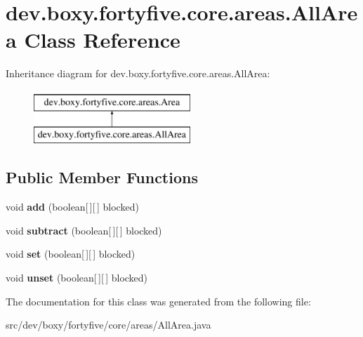 \hypertarget{classdev_1_1boxy_1_1fortyfive_1_1core_1_1areas_1_1_all_area}{
\section{dev.boxy.fortyfive.core.areas.AllArea Class Reference}
\label{d3/d77/classdev_1_1boxy_1_1fortyfive_1_1core_1_1areas_1_1_all_area}
}
Inheritance diagram for dev.boxy.fortyfive.core.areas.AllArea:\begin{figure}[H]
\begin{center}
\leavevmode
\includegraphics[height=2.000000cm]{d3/d77/classdev_1_1boxy_1_1fortyfive_1_1core_1_1areas_1_1_all_area}
\end{center}
\end{figure}
\subsection*{Public Member Functions}
\begin{DoxyCompactItemize}
\item 
\hypertarget{classdev_1_1boxy_1_1fortyfive_1_1core_1_1areas_1_1_all_area_a12ed6995b2a7b10c7fc6c8a81d3bd874}{
void {\bfseries add} (boolean\mbox{[}$\,$\mbox{]}\mbox{[}$\,$\mbox{]} blocked)}
\label{d3/d77/classdev_1_1boxy_1_1fortyfive_1_1core_1_1areas_1_1_all_area_a12ed6995b2a7b10c7fc6c8a81d3bd874}

\item 
\hypertarget{classdev_1_1boxy_1_1fortyfive_1_1core_1_1areas_1_1_all_area_a4df1e622153a6d9bac7bc9ac2b264056}{
void {\bfseries subtract} (boolean\mbox{[}$\,$\mbox{]}\mbox{[}$\,$\mbox{]} blocked)}
\label{d3/d77/classdev_1_1boxy_1_1fortyfive_1_1core_1_1areas_1_1_all_area_a4df1e622153a6d9bac7bc9ac2b264056}

\item 
\hypertarget{classdev_1_1boxy_1_1fortyfive_1_1core_1_1areas_1_1_all_area_a0e9862c433ecffd450357531fd5e7742}{
void {\bfseries set} (boolean\mbox{[}$\,$\mbox{]}\mbox{[}$\,$\mbox{]} blocked)}
\label{d3/d77/classdev_1_1boxy_1_1fortyfive_1_1core_1_1areas_1_1_all_area_a0e9862c433ecffd450357531fd5e7742}

\item 
\hypertarget{classdev_1_1boxy_1_1fortyfive_1_1core_1_1areas_1_1_all_area_ae153e8441dce913f0f7d520d7575955a}{
void {\bfseries unset} (boolean\mbox{[}$\,$\mbox{]}\mbox{[}$\,$\mbox{]} blocked)}
\label{d3/d77/classdev_1_1boxy_1_1fortyfive_1_1core_1_1areas_1_1_all_area_ae153e8441dce913f0f7d520d7575955a}

\end{DoxyCompactItemize}


The documentation for this class was generated from the following file:\begin{DoxyCompactItemize}
\item 
src/dev/boxy/fortyfive/core/areas/AllArea.java\end{DoxyCompactItemize}
